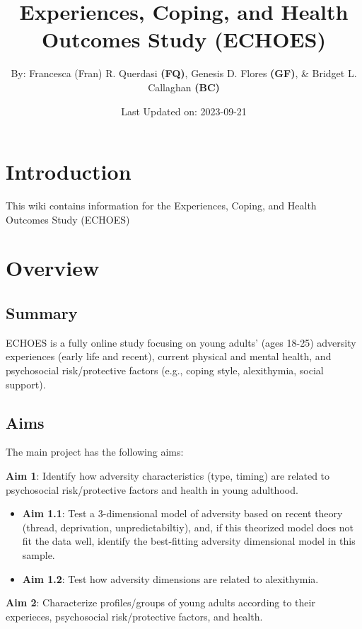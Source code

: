 \documentclass[
]{book}
\title{Experiences, Coping, and Health Outcomes Study (ECHOES)}
\author{By: Francesca (Fran) R. Querdasi \textbf{(FQ)}, Genesis D. Flores \textbf{(GF)}, \& Bridget L. Callaghan \textbf{(BC)}}
\date{Last Updated on: 2023-09-21}
\begin{document}
\maketitle

{
\setcounter{tocdepth}{1}
\tableofcontents
}
\hypertarget{introduction}{%
\chapter{Introduction}\label{introduction}}

This wiki contains information for the Experiences, Coping, and Health Outcomes Study (ECHOES)

\hypertarget{overview}{%
\chapter{Overview}\label{overview}}

\hypertarget{summary}{%
\section{Summary}\label{summary}}

ECHOES is a fully online study focusing on young adults' (ages 18-25) adversity experiences (early life and recent), current physical and mental health, and psychosocial risk/protective factors (e.g., coping style, alexithymia, social support).

\hypertarget{aims}{%
\section{Aims}\label{aims}}

The main project has the following aims:

\textbf{Aim 1}: Identify how adversity characteristics (type, timing) are related to psychosocial risk/protective factors and health in young adulthood.

\begin{itemize}
\item
  \textbf{Aim 1.1}: Test a 3-dimensional model of adversity based on recent theory (thread, deprivation, unpredictabiltiy), and, if this theorized model does not fit the data well, identify the best-fitting adversity dimensional model in this sample.
\item
  \textbf{Aim 1.2}: Test how adversity dimensions are related to alexithymia.
\end{itemize}

\textbf{Aim 2}: Characterize profiles/groups of young adults according to their experieces, psychosocial risk/protective factors, and health.
\end{document}

